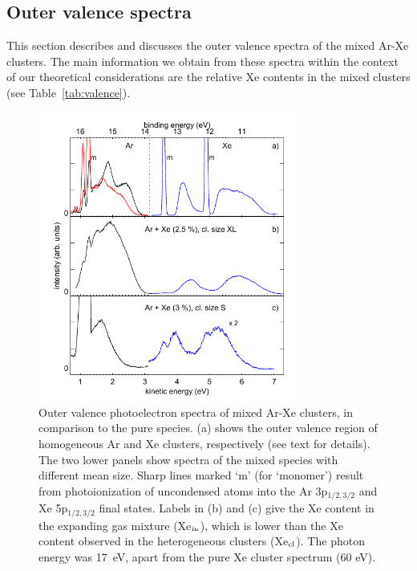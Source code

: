 \subsection{Outer valence spectra}
%
This section describes and discusses the outer valence spectra of the mixed Ar-Xe clusters. The main information we obtain from these spectra within the context of our theoretical considerations are the relative Xe contents in the mixed clusters (see Table\ \ref{tab:valence}). 
%
\begin{figure}[ht]
 \centering
 \includegraphics[width=8.5cm]{pics/figure_oval_1.pdf}
 \caption{
Outer valence photoelectron spectra of mixed Ar-Xe clusters, in comparison to the pure species. 
(a) shows the outer valence region of homogeneous Ar and Xe clusters, respectively (see text for details). 
The two lower panels show spectra of the mixed species with different mean size. 
Sharp lines marked `m' (for `monomer') result from photoionization of uncondensed atoms into the Ar 3p$_{1/2,3/2}$ and Xe 5p$_{1/2,3/2}$ final states. 
Labels in (b) and (c) give the Xe content in the expanding gas mixture (Xe$_{\rm in}$), which is lower than the Xe content observed in the heterogeneous clusters (Xe$_{\rm cl}$). 
The photon energy was 17~eV, apart from the pure Xe cluster spectrum (60 eV).
}
 \label{figure:oval1}
\end{figure}


